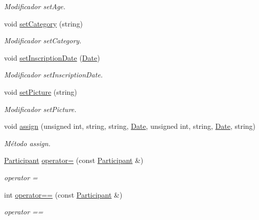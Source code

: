 \begin{DoxyCompactItemize}
\begin{DoxyCompactList}\small\item\em Modificador set\+Age. \end{DoxyCompactList}\item 
void \hyperlink{class_participant_af91cf9adf356fa0f0c0cf8c9fe76a294}{set\+Category} (string)\hypertarget{class_participant_af91cf9adf356fa0f0c0cf8c9fe76a294}{}\label{class_participant_af91cf9adf356fa0f0c0cf8c9fe76a294}

\begin{DoxyCompactList}\small\item\em Modificador set\+Category. \end{DoxyCompactList}\item 
void \hyperlink{class_participant_ab8b20c06f6ef4f9a93c3a0eb4aa486f6}{set\+Inscription\+Date} (\hyperlink{class_date}{Date})\hypertarget{class_participant_ab8b20c06f6ef4f9a93c3a0eb4aa486f6}{}\label{class_participant_ab8b20c06f6ef4f9a93c3a0eb4aa486f6}

\begin{DoxyCompactList}\small\item\em Modificador set\+Inscription\+Date. \end{DoxyCompactList}\item 
void \hyperlink{class_participant_a8ed3db539a1ab6c04b110968347f45fb}{set\+Picture} (string)\hypertarget{class_participant_a8ed3db539a1ab6c04b110968347f45fb}{}\label{class_participant_a8ed3db539a1ab6c04b110968347f45fb}

\begin{DoxyCompactList}\small\item\em Modificador set\+Picture. \end{DoxyCompactList}\item 
void \hyperlink{class_participant_aacee4e07ebfe68b4521217b2c3b6dbf5}{assign} (unsigned int, string, string, \hyperlink{class_date}{Date}, unsigned int, string, \hyperlink{class_date}{Date}, string)\hypertarget{class_participant_aacee4e07ebfe68b4521217b2c3b6dbf5}{}\label{class_participant_aacee4e07ebfe68b4521217b2c3b6dbf5}

\begin{DoxyCompactList}\small\item\em Método assign. \end{DoxyCompactList}\item 
\hyperlink{class_participant}{Participant} \hyperlink{class_participant_af7f2abaadf20275a00ef287ec81ca546}{operator=} (const \hyperlink{class_participant}{Participant} \&)
\begin{DoxyCompactList}\small\item\em operator = \end{DoxyCompactList}\item 
int \hyperlink{class_participant_a847dfbbd072f49e67a5b30d549c2e616}{operator==} (const \hyperlink{class_participant}{Participant} \&)
\begin{DoxyCompactList}\small\item\em operator == \end{DoxyCompactList}\end{DoxyCompactItemize}


